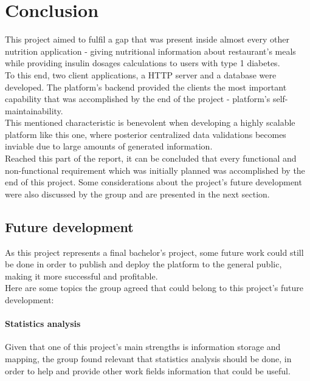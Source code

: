 \chapter{Conclusion}

This project aimed to fulfil a gap that was present inside almost every other nutrition application - 
giving nutritional information about restaurant's meals while providing insulin dosages calculations
to users with type 1 diabetes.\\

To this end, two client applications, a HTTP server and a database were developed.
The platform's backend provided the clients the most important capability that was accomplished by the end
of the project - platform's self-maintainability.\\

This mentioned characteristic is benevolent when developing a highly scalable platform like this one,
where posterior centralized data validations becomes inviable due to large amounts of generated information.\\

Reached this part of the report, it can be concluded that every functional and non-functional requirement which 
was initially planned was accomplished by the end of this project. Some considerations about the project's future
development were also discussed by the group and are presented in the next section.\\

\section{Future development}

As this project represents a final bachelor's project, some future work could still be done in order
to publish and deploy the platform to the general public, making it more successful and profitable.\\

Here are some topics the group agreed that could belong to this project's future development:

\subsubsection{Statistics analysis}

Given that one of this project's main strengths is information storage and mapping, the group found
relevant that statistics analysis should be done, in order to help and provide other work fields
information that could be useful.\\

